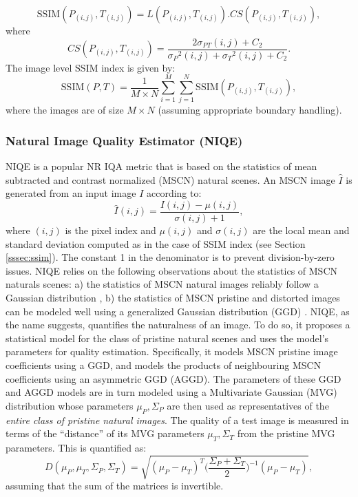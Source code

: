 \documentclass{article}
\begin{document}
\begin{equation}
    \text{SSIM}(P_{(i, j)}, T_{(i, j)}) = L(P_{(i, j)}, T_{(i, j)}).CS(P_{(i, j)}, T_{(i, j)}),
\end{equation}
where 
\begin{equation}
CS(P_{(i, j)}, T_{(i, j)}) = \frac{2\sigma_{PT}(i, j)+C_{2}}{{\sigma_{P}}^{2}(i, j)+{\sigma_{T}}^{2}(i, j)+C_{2}}.
\label{eqn:cs}
\end{equation}
The image level SSIM index is given by:
\begin{equation}
    \text{SSIM}(P, T) = \frac{1}{M\times N}\sum\limits_{i=1}^M\sum\limits_{j=1}^N\text{SSIM}(P_{(i, j)}, T_{(i, j)}),
    \label{eqn:ssim}
\end{equation}
where the images are of size $M\times N$ (assuming appropriate boundary handling).
\subsubsection{Natural Image Quality Estimator (NIQE)}
\label{sssec:niqe}
NIQE \cite{mittal2013making} is a popular NR IQA metric that is based on the statistics of mean subtracted and contrast normalized (MSCN) natural scenes. An MSCN image $\hat{I}$ is generated from an input image $I$ according to:
\begin{equation}
\hat{I}(i, j) = \frac{I(i, j) - \mu(i, j)}{\sigma(i, j) + 1},
\end{equation}
where $(i, j)$ is the pixel index and $\mu(i, j)$ and $\sigma(i, j)$ are the local mean and standard deviation computed as in the case of SSIM index (see Section \ref{sssec:ssim}). The constant 1 in the denominator is to prevent division-by-zero issues.
NIQE relies on the following observations about the statistics of MSCN naturals scenes: a) the statistics of MSCN natural images reliably follow a Gaussian distribution \cite{ruderman1994statistics}, b) the statistics of MSCN pristine and distorted images can be modeled well using a generalized Gaussian distribution (GGD) \cite{moorthy2010statistics}. 
NIQE, as the name suggests, quantifies the naturalness of an image. To do so, it proposes a statistical model for the class of pristine natural scenes and uses the model's parameters for quality estimation. Specifically, it models MSCN pristine image coefficients using a GGD, and models the products of neighbouring MSCN coefficients using an asymmetric GGD (AGGD). The parameters of these GGD and AGGD models are in turn modeled using a Multivariate Gaussian (MVG) distribution whose parameters $\mu_P, \Sigma_P$ are then used as representatives of the {\em{entire class of pristine natural images}}. The quality of a test image is measured in terms of the ``distance'' of its MVG parameters $\mu_T, \Sigma_T$ from the pristine MVG parameters. This is quantified as:
\begin{equation}
    D(\mu_P, \mu_T, \Sigma_P, \Sigma_T) = \sqrt{(\mu_P - \mu_T)^T\bigg(\frac{\Sigma_P + \Sigma_T}{2}\bigg)^{-1}(\mu_P - \mu_T)},
    \label{eqn:niqe}
\end{equation}
assuming that the sum of the matrices is invertible.
\end{document}
